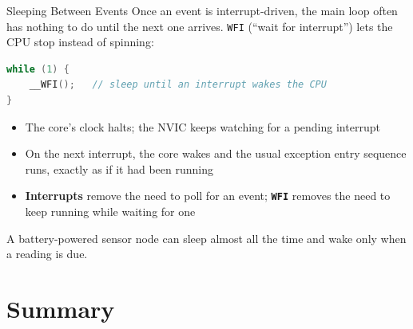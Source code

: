 \documentclass[9pt,aspectratio=169,xcolor=table]{beamer}
\begin{document}
\begin{frame}[fragile]{Sleeping Between Events}
    \leavevmode
    {\small Once an event is interrupt-driven, the main loop often has
    nothing to do until the next one arrives. \alert{\texttt{WFI}}
    (``wait for interrupt'') lets the CPU stop instead of spinning:}

    \begin{lstlisting}[language=C]
while (1) {
    __WFI();   // sleep until an interrupt wakes the CPU
}
\end{lstlisting}

    \begin{itemize}
        \item The core's clock halts; the NVIC keeps watching for a
              pending interrupt
        \item On the next interrupt, the core wakes and the usual
              exception entry sequence runs, exactly as if it had been
              running
        \item \textbf{Interrupts} remove the need to \alert{poll} for an
              event; \textbf{\texttt{WFI}} removes the need to
              \alert{keep running} while waiting for one
    \end{itemize}

    \vspace{1mm}
    {\small A battery-powered sensor node can sleep almost all the
    time and wake only when a reading is due.}
\end{frame}


\section{Summary}
\end{document}
